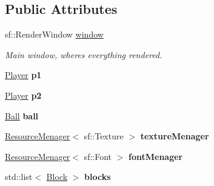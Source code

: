 \subsection*{Public Attributes}
\begin{DoxyCompactItemize}
\item 
\mbox{\label{class_game_engine_ac91a68b9e136eda3dc8cabcb46a5dbaa}} 
sf\+::\+Render\+Window \mbox{\hyperlink{class_game_engine_ac91a68b9e136eda3dc8cabcb46a5dbaa}{window}}
\begin{DoxyCompactList}\small\item\em Main window, where\textquotesingle{}s everything rendered. \end{DoxyCompactList}\item 
\mbox{\label{class_game_engine_a45f8b7ffe6bf84aeb399155fff5198ea}} 
\mbox{\hyperlink{class_player}{Player}} {\bfseries p1}
\item 
\mbox{\label{class_game_engine_a323b76c16f034ed20826889c7f2103ea}} 
\mbox{\hyperlink{class_player}{Player}} {\bfseries p2}
\item 
\mbox{\label{class_game_engine_ad07458d9433b72aa2c9946ccb912b0c9}} 
\mbox{\hyperlink{class_ball}{Ball}} {\bfseries ball}
\item 
\mbox{\label{class_game_engine_ab4b2a10f836b40e474862475b8fce137}} 
\mbox{\hyperlink{class_resource_menager}{Resource\+Menager}}$<$ sf\+::\+Texture $>$ {\bfseries texture\+Menager}
\item 
\mbox{\label{class_game_engine_aae1aa6983a65e2e41f721603804dd36a}} 
\mbox{\hyperlink{class_resource_menager}{Resource\+Menager}}$<$ sf\+::\+Font $>$ {\bfseries font\+Menager}
\item 
\mbox{\label{class_game_engine_a2402978b6652462ea8cca5916c9ac16e}} 
std\+::list$<$ \mbox{\hyperlink{class_block}{Block}} $>$ {\bfseries blocks}
\end{DoxyCompactItemize}
